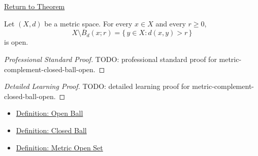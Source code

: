 \newpage
{}
\label{prf:metric-complement-closed-ball-open}

\begin{remark*}[Return]
\hyperref[thm:metric-complement-closed-ball-open]{Return to Theorem}
\end{remark*}

\begin{theorem*}
Let \((X,d)\) be a metric space.  For every \(x\in X\) and every \(r\geq 0\),
\[
  X\setminus \overline{B}_d(x;r)
  =
  \{\,y\in X:d(x,y)>r\,\}
\]
is open.
\end{theorem*}

\begin{proof}[Professional Standard Proof]
\LRAProofBodyStart
TODO: professional standard proof for metric-complement-closed-ball-open.
\end{proof}

\begin{proof}[Detailed Learning Proof]
\LRAProofBodyStart
TODO: detailed learning proof for metric-complement-closed-ball-open.
\end{proof}

\begin{remark*}
\end{remark*}

\begin{dependencies}
\begin{itemize}
  \item \hyperref[def:metric-open-ball]{Definition: Open Ball}
  \item \hyperref[def:metric-closed-ball]{Definition: Closed Ball}
  \item \hyperref[def:metric-open-set]{Definition: Metric Open Set}
\end{itemize}
\end{dependencies}

\clearpage
